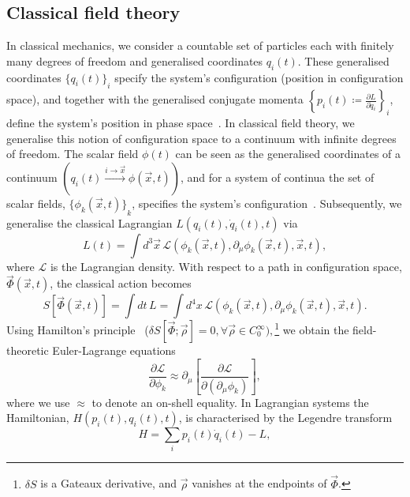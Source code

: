 \documentclass[11pt, a4paper]{article}
\begin{document}
\subsection{Classical field theory}
In classical mechanics, we consider a countable set of particles
each with finitely many degrees of freedom
and generalised coordinates $q_i(t)$. These generalised coordinates ${\{ q_i(t) \}}_i$ specify
the system's configuration (position in configuration space), and together with the 
generalised conjugate momenta
${\left\{p_i(t) \coloneq \frac{\partial L}{\partial \dot{q}_i} \right\}}_i $, 
define the system's position in phase space~\cite{LA&LI-Mech-I}.
In classical field theory, we generalise this notion of configuration space to a
continuum with infinite degrees of freedom. The scalar field $\phi(t)$ can be seen as
the generalised coordinates of a continuum 
$\left( q_i(t) \xrightarrow{i \rightarrow \vec{x}} \phi(\vec{x}, t) \right)$, and for a system
of continua the set of scalar fields, ${\{ \phi_k(\vec{x}, t) \}}_k$,
specifies the system's configuration~\cite{ClassField}.
Subsequently, we generalise the classical Lagrangian $L(q_i(t), \dot{q}_i(t), t)$ via
\begin{equation}
  L(t) = \int{d^{3}\vec{x}\,
  \mathcal{L}(\phi_k(\vec{x}, t),\partial_{\mu}\phi_k(\vec{x}, t), \vec{x}, t)},
\end{equation}
where $\mathcal{L}$ is the Lagrangian density. With respect to a path
in configuration space, $\vec{\Phi}(\vec{x}, t)$, the classical action becomes 
\begin{equation}
  S\left[\vec{\Phi}(\vec{x}, t) \right] = \int{dt\,L} 
  = \int{d^4x\,\mathcal{L}(\phi_k(\vec{x}, t),\partial_{\mu}\phi_k(\vec{x}, t), \vec{x}, t)}.
\end{equation}
Using Hamilton's principle~\cite{LA&LI-Mech-VII} ($\delta S[\vec{\Phi}; \vec{\rho} ] = 0,
\forall\vec{\rho} \in C_{0}^{\infty}),$\footnote{$\delta{S}$ is a Gateaux derivative,
and $\vec{\rho}$ vanishes at the endpoints of $\vec{\Phi}$.}
we obtain the field-theoretic Euler-Lagrange equations 
\begin{equation}
  \frac{\partial \mathcal{L}}{\partial \phi_k}
  \approx \partial_\mu \left[ \frac{\partial \mathcal{L}}{\partial(\partial_\mu{\phi_k}) } \right],
\end{equation}
where we use $\approx$ to denote an on-shell equality.
In Lagrangian systems the Hamiltonian, $H(p_i(t), q_i(t), t)$,
is characterised by the Legendre transform
\begin{equation}
  H = \sum_{i}{p_i(t)\dot{q}_i(t) - L},
\end{equation}
\end{document}
